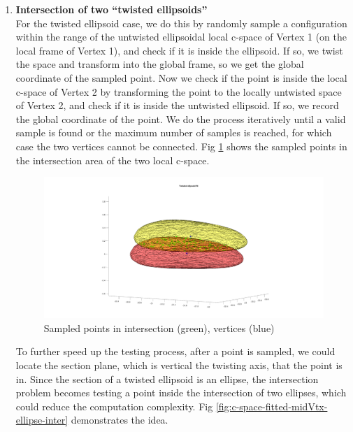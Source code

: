 \documentclass{article}
\begin{document}
\begin{enumerate}
\begin{enumerate}
\begin{enumerate}
\item {\bf Intersection of two ``twisted ellipsoids''}\\
For the twisted ellipsoid case, we do this by randomly sample a configuration within the range of the untwisted ellipsoidal local c-space of Vertex 1 (on the local frame of Vertex 1), and check if it is inside the ellipsoid. If so, we twist the space and transform into the global frame, so we get the global coordinate of the sampled point. Now we check if the point is inside the local c-space of Vertex 2 by transforming the point to the locally untwisted space of Vertex 2, and check if it is inside the untwisted ellipsoid. If so, we record the global coordinate of the point. We do the process iteratively until a valid sample is found or the maximum number of samples is reached, for which case the two vertices cannot be connected. Fig \ref{fig:c-space-fitted-midVtx} shows the sampled points in the intersection area of the two local c-space. 

\begin{figure}[!h]
\centering
\includegraphics[scale=0.15]{layer_connection_c-space_fitted_midVtx.png}
\caption{Sampled points in intersection (green), vertices (blue)}
\label{fig:c-space-fitted-midVtx}
\end{figure}

To further speed up the testing process, after a point is sampled, we could locate the section plane, which is vertical the twisting axis, that the point is in. Since the section of a twisted ellipsoid is an ellipse, the intersection problem becomes testing a point inside the intersection of two ellipses, which could reduce the computation complexity. Fig \ref{fig:c-space-fitted-midVtx-ellipse-inter} demonstrates the idea.


\end{enumerate}
\end{enumerate}
\end{enumerate}
\end{document}
